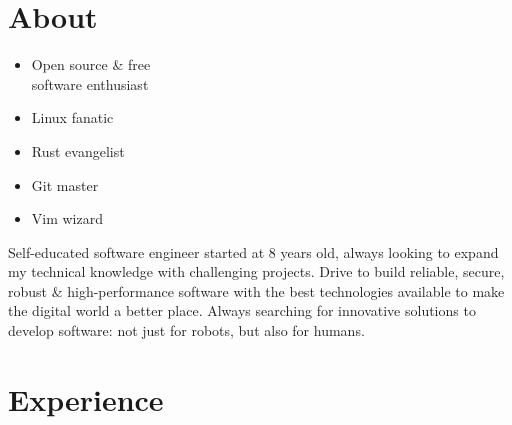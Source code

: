 \documentclass[]{cv-timvisee}
\providecommand{\tightlist}{%
\setlength{\itemsep}{0pt}\setlength{\parskip}{0pt}}
\begin{document}

\section{About}

{\setlength\multicolsep{3pt}%
\begin{multicols}{3}
\begin{itemize}
  \tightlist{}
  \item Open source \& free \\software enthusiast
  \item Linux fanatic
  \item Rust evangelist
  \item Git master
  \item Vim wizard
\end{itemize}
\end{multicols}}

Self-educated software engineer started at 8 years old, always looking to expand
my technical knowledge with challenging projects.
Drive to build reliable, secure, robust \& high-performance software with the
best technologies available to make the digital world a better place.
Always searching for innovative solutions to develop software: not just for
robots, but also for humans.


\section{Experience}
\end{document}
